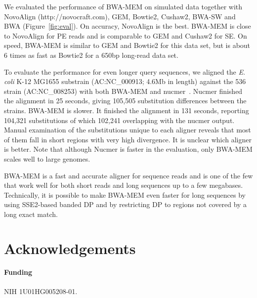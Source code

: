 \documentclass{bioinfo}
\begin{document}
We evaluated the performance of BWA-MEM on simulated data together with
NovoAlign (http://novocraft.com), GEM, Bowtie2, Cushaw2, BWA-SW and BWA
(Figure~\ref{fig:eval}). On accuracy, NovoAlign is the best. BWA-MEM is close
to NovoAlign for PE reads and is comparable to GEM and Cushaw2 for SE.  On
speed, BWA-MEM is similar to GEM and Bowtie2 for this data set, but is about
6 times as fast as Bowtie2 for a 650bp long-read data set.

To evaluate the performance for even longer query sequences, we aligned the
{\it E. coli} K-12 MG1655 substrain (AC:NC\_000913; 4.6Mb in length) against
the 536 strain (AC:NC\_008253) with both BWA-MEM and
nucmer~\citep{Kurtz:2004zr}. Nucmer finished the alignment in 25 seconds,
giving 105,505 substitution differences between the strains. BWA-MEM is slower.
It finished the alignment in 131 seconds, reporting 104,321 substitutions of
which 102,241 overlapping with the nucmer output. Manual examination of the
substitutions unique to each aligner reveals that most of them fall in short
regions with very high divergence. It is unclear which aligner is better. Note
that although Nucmer is faster in the evaluation, only BWA-MEM scales well to
large genomes.

BWA-MEM is a fast and accurate aligner for sequence reads and is one of the few
that work well for both short reads and long sequences up to a few megabases.
Technically, it is possible to make BWA-MEM even faster for long sequences by
using SSE2-based banded DP and by restricting DP to regions not covered by a
long exact match.

\section{Acknowledgements}
\paragraph{Funding\textcolon} NIH 1U01HG005208-01.

\end{document}
